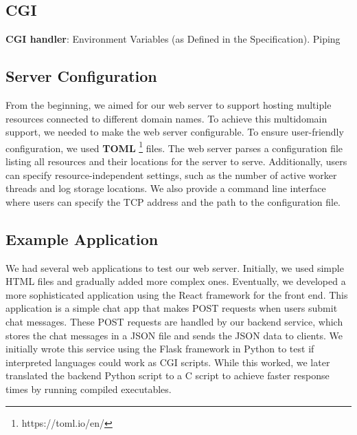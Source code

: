 \subsection*{CGI}
\textbf{CGI handler}: Environment Variables (as Defined in the Specification). Piping %

\subsection*{Server Configuration}
From the beginning, we aimed for our web server to support hosting multiple resources connected to different domain names. To achieve this multidomain support, we needed to make the web server configurable. To ensure user-friendly configuration, we used \textbf{TOML} \footnote{https://toml.io/en/} files. The web server parses a configuration file listing all resources and their locations for the server to serve. Additionally, users can specify resource-independent settings, such as the number of active worker threads and log storage locations. We also provide a command line interface where users can specify the TCP address and the path to the configuration file.

\subsection*{Example Application}

We had several web applications to test our web server. Initially, we used simple HTML files and gradually added more complex ones. Eventually, we developed a more sophisticated application using the React framework for the front end. This application is a simple chat app that makes POST requests when users submit chat messages. These POST requests are handled by our backend service, which stores the chat messages in a JSON file and sends the JSON data to clients. We initially wrote this service using the Flask framework in Python to test if interpreted languages could work as CGI scripts. While this worked, we later translated the backend Python script to a C script to achieve faster response times by running compiled executables. 

